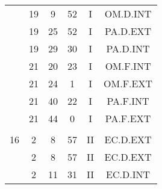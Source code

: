 \documentclass[12pt, a4paper]{article}
\begin{document}
\begin{multicols}{3}
{\begin{tabular}{c c c c c c}
	 	 	 	 & 19 & 9 & 52 & I & OM.D.INT\\%
	 	 	 	 & 19 & 25 & 52 & I & PA.D.EXT\\%
	 	 	 	 & 19 & 29 & 30 & I & PA.D.INT\\%
	 	 	 	 & 21 & 20 & 23 & I & OM.F.INT\\%
	 	 	 	 & 21 & 24 & 1 & I & OM.F.EXT\\%
	 	 	 	 & 21 & 40 & 22 & I & PA.F.INT\\%
	 	 	 	 & 21 & 44 & 0 & I & PA.F.EXT\\%
	 	 	 	 & & & & & \\%
	 	 	 	16 & 2 & 8 & 57 & II & EC.D.EXT\\%
	 	 	 	 & 2 & 8 & 57 & II & EC.D.EXT\\%
	 	 	 	 & 2 & 11 & 31 & II & EC.D.INT\\%
	 	 \end{tabular}
 	}
\end{multicols}
\end{document}
